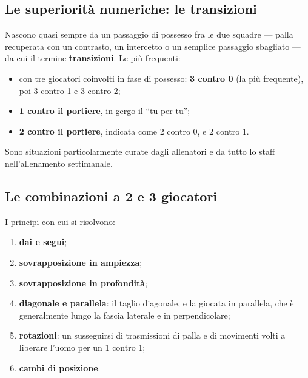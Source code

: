 \subsection{Le superiorità numeriche: le transizioni}

Nascono quasi sempre da un passaggio di possesso fra le due squadre --- palla recuperata con un
contrasto, un intercetto o un semplice passaggio sbagliato --- da cui il termine
\textbf{transizioni}. Le più frequenti:
\begin{itemize}
  \item con tre giocatori coinvolti in fase di possesso: \textbf{3 contro 0} (la più frequente), poi
    3 contro 1 e 3 contro 2;
  \item \textbf{1 contro il portiere}, in gergo il ``tu per tu'';
  \item \textbf{2 contro il portiere}, indicata come 2 contro 0, e 2 contro 1.
\end{itemize}
Sono situazioni particolarmente curate dagli allenatori e da tutto lo staff nell'allenamento
settimanale.

\subsection{Le combinazioni a 2 e 3 giocatori}

I principi con cui si risolvono:
\begin{enumerate}
  \item \textbf{dai e segui};
  \item \textbf{sovrapposizione in ampiezza};
  \item \textbf{sovrapposizione in profondità};
  \item \textbf{diagonale e parallela}: il taglio diagonale, e la giocata in parallela, che è
    generalmente lungo la fascia laterale e in perpendicolare;
  \item \textbf{rotazioni}: un susseguirsi di trasmissioni di palla e di movimenti volti a liberare
    l'uomo per un 1 contro 1;
  \item \textbf{cambi di posizione}.
\end{enumerate}

